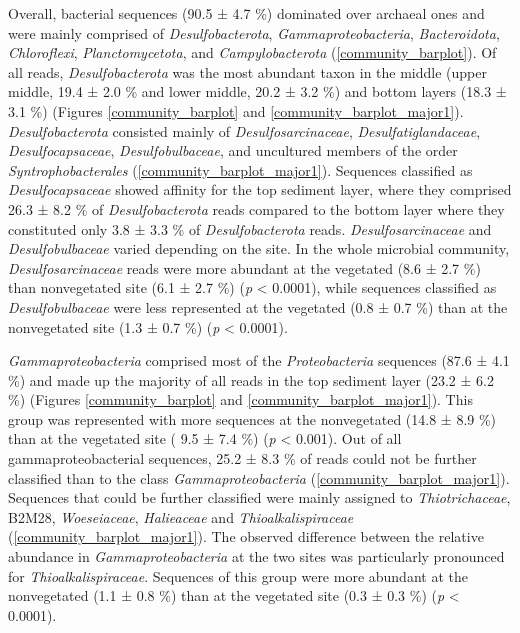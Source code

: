 \documentclass[12pt,]{article}
\begin{document}
Overall, bacterial sequences (90.5 ± 4.7 \si{\percent}) dominated over
archaeal ones and were mainly comprised of \emph{Desulfobacterota},
\emph{Gammaproteobacteria}, \emph{Bacteroidota}, \emph{Chloroflexi},
\emph{Planctomycetota}, and \emph{Campylobacterota}
(\autoref{community_barplot}). Of all reads, \emph{Desulfobacterota} was
the most abundant taxon in the middle (upper middle, 19.4 ± 2.0
\si{\percent} and lower middle, 20.2 ± 3.2 \si{\percent}) and bottom
layers (18.3 ± 3.1 \si{\percent}) (Figures \ref{community_barplot} and
\ref{community_barplot_major1}). \emph{Desulfobacterota} consisted
mainly of \emph{Desulfosarcinaceae}, \emph{Desulfatiglandaceae},
\emph{Desulfocapsaceae}, \emph{Desulfobulbaceae}, and uncultured members
of the order \emph{Syntrophobacterales}
(\autoref{community_barplot_major1}). Sequences classified as
\emph{Desulfocapsaceae} showed affinity for the top sediment layer,
where they comprised 26.3 ± 8.2 \si{\percent} of \emph{Desulfobacterota}
reads compared to the bottom layer where they constituted only 3.8 ± 3.3
\si{\percent} of \emph{Desulfobacterota} reads.
\emph{Desulfosarcinaceae} and \emph{Desulfobulbaceae} varied depending
on the site. In the whole microbial community, \emph{Desulfosarcinaceae}
reads were more abundant at the vegetated (8.6 ± 2.7 \si{\percent}) than
nonvegetated site (6.1 ± 2.7 \si{\percent}) (\emph{p} \textless{}
0.0001), while sequences classified as \emph{Desulfobulbaceae} were less
represented at the vegetated (0.8 ± 0.7 \si{\percent}) than at the
nonvegetated site (1.3 ± 0.7 \si{\percent}) (\emph{p} \textless{}
0.0001).

\emph{Gammaproteobacteria} comprised most of the \emph{Proteobacteria}
sequences (87.6 ± 4.1 \si{\percent}) and made up the majority of all
reads in the top sediment layer (23.2 ± 6.2 \si{\percent}) (Figures
\ref{community_barplot} and \ref{community_barplot_major1}). This group
was represented with more sequences at the nonvegetated (14.8 ± 8.9
\si{\percent}) than at the vegetated site ( 9.5 ± 7.4 \si{\percent})
(\emph{p} \textless{} 0.001). Out of all gammaproteobacterial sequences,
25.2 ± 8.3 \si{\percent} of reads could not be further classified than
to the class \emph{Gammaproteobacteria}
(\autoref{community_barplot_major1}). Sequences that could be further
classified were mainly assigned to \emph{Thiotrichaceae}, B2M28,
\emph{Woeseiaceae}, \emph{Halieaceae} and \emph{Thioalkalispiraceae}
(\autoref{community_barplot_major1}). The observed difference between
the relative abundance in \emph{Gammaproteobacteria} at the two sites
was particularly pronounced for \emph{Thioalkalispiraceae}. Sequences of
this group were more abundant at the nonvegetated (1.1 ± 0.8
\si{\percent}) than at the vegetated site (0.3 ± 0.3 \si{\percent})
(\emph{p} \textless{} 0.0001).
\end{document}
